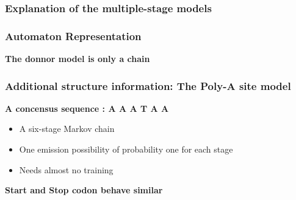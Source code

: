 \documentclass{beamer}[12pt]
\begin{document}
\begin{frame}
\frametitle{Explanation of the multiple-stage models}
	\begin{figure}
	\end{figure}
	
	
	
\end{frame}


\begin{frame}
\frametitle{Automaton Representation}
	\begin{figure}
	\end{figure}
	\begin{figure}
	\end{figure}
	\pause\begin{center}
		\textbf{The donnor model is only a chain}
	\end{center}
\end{frame}


\begin{frame}
\frametitle{Additional structure information: The Poly-A site model}
	\begin{figure}
	\end{figure}
	
	\textbf{A concensus sequence : A A A T A A}
	
	\begin{itemize}
		\item A six-stage Markov chain
		\item One emission possibility of probability one for each stage 
		\item Needs almost no training 
	\end{itemize}
	
	\textbf{Start and Stop codon behave similar}
\end{frame}
\end{document}
